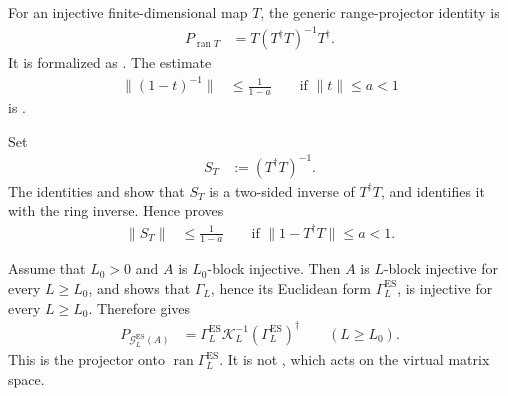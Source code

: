 \documentclass{article}
\begin{document}
For an injective finite-dimensional map $T$, the generic range-projector
identity is
\begin{align}
    P_{\operatorname{ran}T}
     & =T(T^\dagger T)^{-1}T^\dagger.
    \label{eq:cpgsv21_martingale_overlap_injective_range_projector}
\end{align}
It is formalized as
. The
estimate
\begin{align}
    \lVert(1-t)^{-1}\rVert
     & \leq\frac{1}{1-a}
    \qquad
    \text{if }\lVert t\rVert\leq a<1
    \label{eq:cpgsv21_martingale_overlap_neumann_inverse_bound}
\end{align}
is .

Set
\begin{align}
    S_T
     & :=(T^\dagger T)^{-1}.
    \label{eq:cpgsv21_martingale_overlap_inverse_gram_definition}
\end{align}
The identities
 and
 show that
$S_T$ is a two-sided inverse of $T^\dagger T$, and
 identifies it with the
ring inverse. Hence
proves
\begin{align}
    \lVert S_T\rVert
     & \leq\frac{1}{1-a}
    \qquad
    \text{if }\lVert1-T^\dagger T\rVert\leq a<1.
    \label{eq:cpgsv21_martingale_overlap_inverse_gram_identity_bound}
\end{align}

Assume that $L_0>0$ and $A$ is $L_0$-block injective. Then $A$ is
$L$-block injective for every $L\geq L_0$, and
 shows that
$\Gamma_L$, hence its Euclidean form $\Gamma_L^{\mathrm{ES}}$, is injective
for every $L\geq L_0$. Therefore
gives
\begin{align}
    P_{\mathcal G_L^{\mathrm{ES}}(A)}
     & =
    \Gamma_L^{\mathrm{ES}}\mathcal K_L^{-1}
    (\Gamma_L^{\mathrm{ES}})^\dagger
    \qquad(L\geq L_0).
    \label{eq:cpgsv21_martingale_overlap_physical_inverse_gram_projector}
\end{align}
This is the projector onto
$\operatorname{ran}\Gamma_L^{\mathrm{ES}}$. It is not
, which acts on the virtual matrix space.
\end{document}
